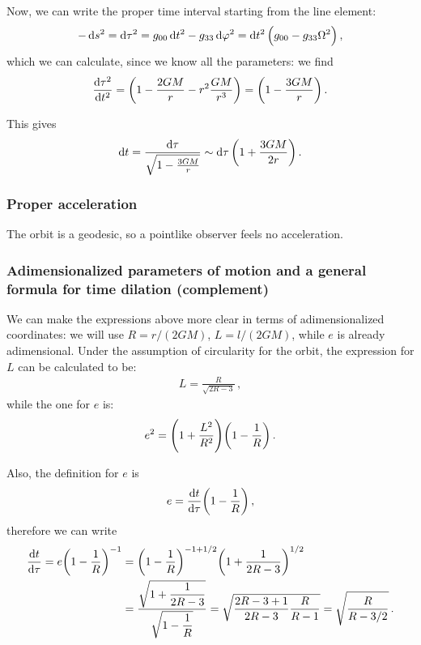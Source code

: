 \documentclass[main.tex]{subfiles}
\begin{document}
Now, we can write the proper time interval starting from the line element: 
%
\begin{align}
  - \dd{s^2} = \dd{\tau^2} 
  = g_{00} \dd{t^2} - g_{33} \dd{\varphi^2}
  = \dd{t^2} \qty(g_{00} - g_{33} \Omega^2)
\,,
\end{align}
%
which we can calculate, since we know all the parameters: we find
%
\begin{align}
  \frac{\dd{\tau^2 }}{ \dd{t^2}} = \qty(1 - \frac{2GM}{r} - r^2 \frac{GM}{r^3})
  = \qty(1 - \frac{3GM}{r})
\,.
\end{align}

This gives 
%
\begin{align}
  \dd{t}  = \frac{\dd{\tau }}{\sqrt{1 - \frac{3GM}{r}}}
  \sim \dd{\tau } \qty(1 + \frac{3GM}{2r})
\,.
\end{align}
%


\subsubsection{Proper acceleration}

The orbit is a geodesic, so a pointlike observer feels no acceleration. 

\subsubsection{Adimensionalized parameters of motion and a general formula for time dilation (complement)} \label{sec:general-time-dilation}

We can make the expressions above more clear in terms of adimensionalized coordinates: we will use \(R = r/(2GM)\), \(L = l / (2GM)\), while \(e\) is already adimensional. 
Under the assumption of circularity for the orbit, the expression for \(L\) can be calculated to be:
%
\begin{align}
  L  =\frac{R}{\sqrt{2 R - 3}}
\,,
\end{align}
%
while the one for \(e\) is: 
%
\begin{align}
  e^2 = \qty(1 + \frac{L^2}{R^2}) \qty(1 - \frac{1}{R})
\,.
\end{align}

Also, the definition for \(e\) is 
%
\begin{align}
  e = \dv{t}{\tau } \qty(1 - \frac{1}{R})
\,,
\end{align}
%
therefore we can write 
%
\begin{subequations}
\begin{align}
  \dv{t}{ \tau } = e \qty(1-\frac{1}{R})^{-1} &= \qty(1 - \frac{1}{R})^{-1+1/2} \qty(1+ \frac{1}{2 R - 3})^{1/2} \\
  &= \frac{\sqrt{1 + \displaystyle \frac{1}{2R-3}}}{\sqrt{ 1- \displaystyle \frac{1}{R}}}
  = \sqrt{ \frac{2R-3+1}{2R-3} \frac{R}{R-1}} 
  = \sqrt{\frac{R}{R - 3/2}}
\,.
\end{align}
\end{subequations}
\end{document}
